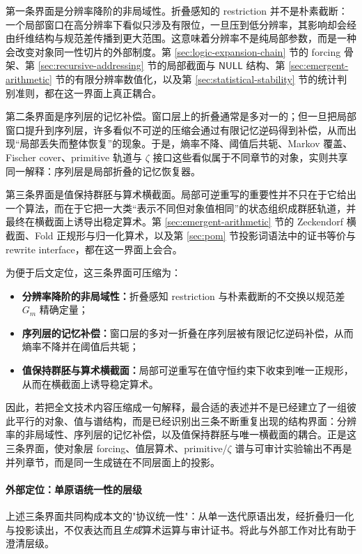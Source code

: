 第一条界面是分辨率降阶的非局域性。折叠感知的 restriction 并不是朴素截断：一个局部窗口在高分辨率下看似只涉及有限位，一旦压到低分辨率，其影响却会经由纤维结构与规范差传播到更大范围。这意味着分辨率不是纯局部参数，而是一种会改变对象同一性切片的外部制度。第 \ref{sec:logic-expansion-chain} 节的 forcing 骨架、第 \ref{sec:recursive-addressing} 节的局部截面与 \(\mathsf{NULL}\) 结构、第 \ref{sec:emergent-arithmetic} 节的有限分辨率数值化，以及第 \ref{sec:statistical-stability} 节的统计判别准则，都在这一界面上真正耦合。

第二条界面是序列层的记忆补偿。窗口层上的折叠通常是多对一的；但一旦把局部窗口提升到序列层，许多看似不可逆的压缩会通过有限记忆逆码得到补偿，从而出现“局部丢失而整体恢复”的现象。于是，熵率不降、阈值后共轭、Markov 覆盖、Fischer cover、primitive 轨道与 \(\zeta\) 接口这些看似属于不同章节的对象，实则共享同一解释：序列层是局部折叠的记忆恢复器。

第三条界面是值保持群胚与算术横截面。局部可逆重写的重要性并不只在于它给出一个算法，而在于它把一大类“表示不同但对象值相同”的状态组织成群胚轨道，并最终在横截面上诱导出稳定算术。第 \ref{sec:emergent-arithmetic} 节的 Zeckendorf 横截面、Fold 正规形与归一化算术，以及第 \ref{sec:pom} 节投影词语法中的证书等价与 rewrite interface，都在这一界面上会合。

为便于后文定位，这三条界面可压缩为：
\begin{itemize}
  \item \textbf{分辨率降阶的非局域性：}折叠感知 restriction 与朴素截断的不交换以规范差 \(G_m\) 精确定量；
  \item \textbf{序列层的记忆补偿：}窗口层的多对一折叠在序列层被有限记忆逆码补偿，从而熵率不降并在阈值后共轭；
  \item \textbf{值保持群胚与算术横截面：}局部可逆重写在值守恒约束下收束到唯一正规形，从而在横截面上诱导稳定算术。
\end{itemize}
因此，若把全文技术内容压缩成一句解释，最合适的表述并不是已经建立了一组彼此平行的对象、值与谱结构，而是已经识别出三条不断重复出现的结构界面：分辨率的非局域性、序列层的记忆补偿，以及值保持群胚与唯一横截面的耦合。正是这三条界面，使对象层 forcing、值层算术、primitive/\(\zeta\) 谱与可审计实验输出不再是并列章节，而是同一生成链在不同层面上的投影。

\paragraph{外部定位：单原语统一性的层级}
上述三条界面共同构成本文的"协议统一性"：从单一迭代原语出发，经折叠归一化与投影读出，不仅表达而且\emph{生成}算术运算与审计证书。将此与外部工作对比有助于澄清层级。

